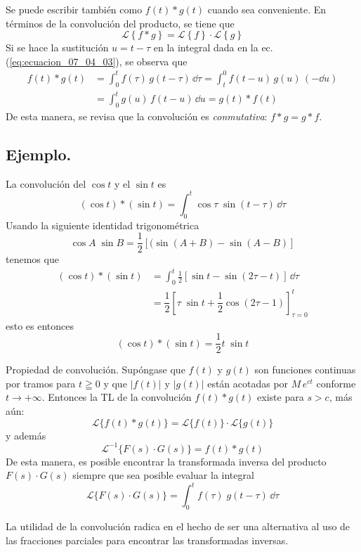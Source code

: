Se puede escribir también como $f(t) * g(t)$ cuando sea conveniente. En términos de la convolución del producto, se tiene que
\[ \mathscr{L} \left\{ f * g \right\} = \mathscr{L} \left\{ f \right\} \cdot \mathscr{L} \left\{ g \right\} \]
Si se hace la sustitución $u = t - \tau$ en la integral dada en la ec. (\ref{eq:ecuacion_07_04_03}), se observa que
\begin{align*}
f(t) * g(t) &= \int_{0}^{t} f(\tau) \, g(t - \tau) \, \dd \tau = \int_{t}^{0} f(t - u) \, g(u) \, (-\dd u) \\
&= \int_{0}^{t} g(u) \, f(t - u) \, \dd u = g(t) * f(t)
\end{align*}
De esta manera, se revisa que la convolución es \textit{conmutativa}: $f * g = g * f$.
\subsection*{Ejemplo.}
La convolución del $\cos t$ y el $\sin t$ es
\[ (\cos t) * (\sin t) = \int_{0}^{t} \cos \tau	\; \sin (t - \tau) \, \dd \tau \]
Usando la siguiente identidad trigonométrica
\[ \cos A \; \sin B =  \dfrac{1}{2} [ (\sin(A + B) - \sin (A - B) ] \]
tenemos que
\begin{align*}
(\cos t) * (\sin t) &=  \int_{0}^{t} \frac{1}{2} [\sin t - \sin (2 \tau - t)] \, \dd \tau \\
&= \dfrac{1}{2} \left[ \tau \; \sin t + \dfrac{1}{2} \cos (2 \tau - 1) \right]_{\tau=0}^{t}
\end{align*}
esto es entonces
\[ (\cos t) * (\sin t) = \frac{1}{2} t \; \sin t \]
\begin{teo}{Propiedad de convolución.}
Supóngase que $f(t)$ y $g(t)$ son funciones continuas por tramos para $ t \geqq 0$ y que $\vert f(t) \vert$ y $\vert g(t) \vert$ están acotadas por $M \, e^{ct}$ conforme $t \to +\infty$. Entonces la TL de la convolución $f(t) * g(t)$ existe para $s > c$, más aún:
\begin{equation}
\mathscr{L} \{ f(t) * g(t) \} = \mathscr{L} \{ f(t) \} \cdot \mathscr{L} \{ g(t) \}
\label{eq:ecuacion_07_04_04}
\end{equation}
y además
\begin{equation}
\mathscr{L}^{-1} \{ F(s) \cdot G(s) \} = f(t) * g(t)
\label{eq:ecuacion_07_04_05}
\end{equation}
De esta manera, es posible encontrar la transformada inversa del producto $F(s) \cdot G(s)$ siempre que sea posible evaluar la integral
\begin{equation}
\mathscr{L} \{ F(s) \cdot G(s) \} = \int_{0}^{t} f(\tau) \; g(t - \tau) \, \dd \tau
\label{eq:ecuacion_07_04_05b}
\end{equation}
\end{teo}
 La utilidad de la convolución radica en el hecho de ser una alternativa al uso de las fracciones parciales para encontrar las transformadas inversas.
